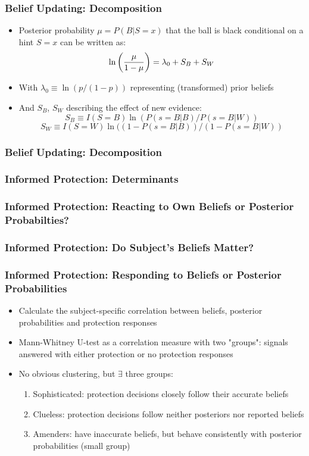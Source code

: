 \documentclass[11pt,hyperref={bookmarks=false}]{beamer}
\begin{document}
\begin{frame}
\frametitle{Belief Updating: Decomposition}
\begin{itemize}
\item Posterior probability $\mu=P(B|S=x)$ that the ball is black conditional on a hint $S=x$ can be written as:
$$\ln \left({\mu \over 1-\mu} \right)=\lambda_0+S_B+S_W$$
\item With $\lambda_0\equiv \ln(p/(1-p))$ representing (transformed) prior beliefs
\item And $S_B$, $S_W$ describing the effect of new evidence:
$$S_B\equiv I(S=B)\ln(P(s=B|B)/P(s=B|W))$$
$$S_W\equiv I(S=W)\ln((1-P(s=B|B))/(1-P(s=B|W))$$
\end{itemize}
\end{frame}


\begin{frame}
\frametitle{Belief Updating: Decomposition}

\end{frame}



\begin{frame}
\frametitle{Informed Protection: Determinants}
\footnotesize


\end{frame}


\begin{frame}
\frametitle{Informed Protection: Reacting to Own Beliefs or Posterior Probabilties?}

\end{frame}


\begin{frame}
\frametitle{Informed Protection: Do Subject's Beliefs Matter?}

\end{frame}


\begin{frame}
\frametitle{Informed Protection: Responding to Beliefs or Posterior Probabilities}
\begin{itemize}
\item Calculate the subject-specific correlation between beliefs, posterior probabilities and protection responses
\item Mann-Whitney U-test as  a correlation measure with two "groups": signals answered with either protection or no protection responses
\item No obvious clustering, but $\exists$ three groups:
\begin{enumerate}
\item Sophisticated: protection decisions closely follow their accurate beliefs
\item Clueless: protection decisions follow neither posteriors nor reported beliefs
\item Amenders: have inaccurate beliefs, but behave consistently with posterior probabilities (small group)
\end{enumerate}
\end{itemize}
\end{frame}
\end{document}
